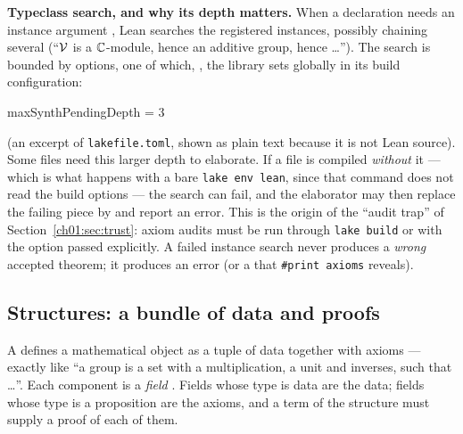 \textbf{Typeclass search, and why its depth matters.} When a declaration needs an instance argument
\lean{[C X]}, Lean searches the registered instances, possibly chaining several (``$\mathcal{V}$ is a
${\mathbb{C}}$-module, hence an additive group, hence \dots''). The search is bounded by options, one of which,
, the library sets globally in its build configuration:
\begin{plaincode}
[leanOptions]
maxSynthPendingDepth = 3
\end{plaincode}
(an excerpt of \texttt{lakefile.toml}, shown as plain text because it is not Lean source). Some
files need this larger depth to elaborate. If a file is compiled \emph{without} it --- which is what
happens with a bare \texttt{lake env lean}, since that command does not read the build options ---
the search can fail, and the elaborator may then replace the failing piece by  and
report an error. This is the origin of the ``audit trap'' of Section~\ref{ch01:sec:trust}: axiom
audits must be run through \texttt{lake build} or with the option passed explicitly. A failed
instance search never produces a \emph{wrong} accepted theorem; it produces an error (or a
 that \texttt{\#print axioms} reveals).

\subsection{Structures: a bundle of data and proofs}\label{ch01:sec:structures}

A  defines a mathematical object as a tuple of data together with axioms --- exactly
like ``a group is a set with a multiplication, a unit and inverses, such that \dots''. Each component
is a \emph{field} . Fields whose type is data are the data; fields whose type is a
proposition are the axioms, and a term of the structure must supply a proof of each of them.

